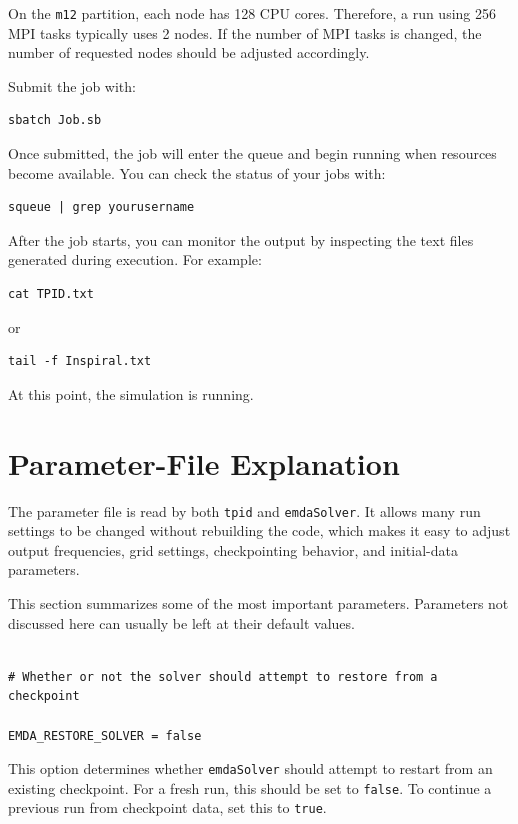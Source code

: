 On the \texttt{m12} partition, each node has 128 CPU cores. Therefore, a run
using 256 MPI tasks typically uses 2 nodes. If the number of MPI tasks is
changed, the number of requested nodes should be adjusted accordingly.

Submit the job with:

\begin{verbatim}
sbatch Job.sb
\end{verbatim}

Once submitted, the job will enter the queue and begin running when resources
become available. You can check the status of your jobs with:

\begin{verbatim}
squeue | grep yourusername
\end{verbatim}

After the job starts, you can monitor the output by inspecting the text files
generated during execution. For example:

\begin{verbatim}
cat TPID.txt
\end{verbatim}

or

\begin{verbatim}
tail -f Inspiral.txt
\end{verbatim}

At this point, the simulation is running.

\section{Parameter-File Explanation}

The parameter file is read by both \texttt{tpid} and \texttt{emdaSolver}. It
allows many run settings to be changed without rebuilding the code, which makes
it easy to adjust output frequencies, grid settings, checkpointing behavior,
and initial-data parameters.

This section summarizes some of the most important parameters. Parameters not
discussed here can usually be left at their default values.

\begin{verbatim}

# Whether or not the solver should attempt to restore from a checkpoint

EMDA_RESTORE_SOLVER = false
\end{verbatim}

This option determines whether \texttt{emdaSolver} should attempt to restart
from an existing checkpoint. For a fresh run, this should be set to
\texttt{false}. To continue a previous run from checkpoint data, set this to
\texttt{true}.

